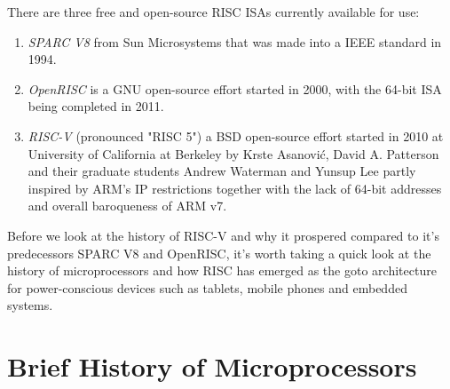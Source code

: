 \documentclass[journal]{IEEEtran}
\begin{document}
There are three free and open-source RISC ISAs currently available for use:
\begin{enumerate}
    \item \emph{SPARC V8} from Sun Microsystems that was made into a IEEE standard in 1994.
    \item \emph{OpenRISC} is a GNU open-source effort started in 2000, with the 64-bit ISA being completed in 2011.
    \item \emph{RISC-V} (pronounced "RISC 5") a BSD open-source effort started in 2010 at University of California at Berkeley by Krste Asanović, David A. Patterson and their graduate students Andrew Waterman and Yunsup Lee  partly inspired by ARM's IP restrictions together with the lack of 64-bit addresses and overall baroqueness of ARM v7.
\end{enumerate}

Before we look at the history of RISC-V and why it prospered compared to it's predecessors SPARC V8 and OpenRISC, it's worth taking a quick look at the history of microprocessors and how RISC has emerged as the goto architecture for power-conscious devices such as tablets, mobile phones and embedded systems.

\section{Brief History of Microprocessors}
\end{document}
